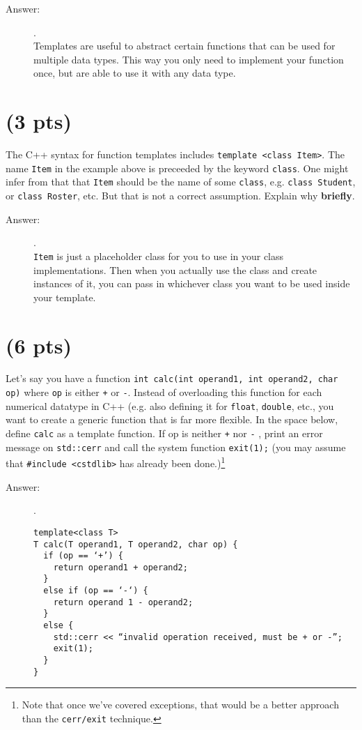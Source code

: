 \documentclass[11pt]{article}
\begin{document}
\begin{description}
  \item[Answer:] .\\
  Templates are useful to abstract certain functions that can be used for multiple data types.
  This way you only need to implement your function once, but are able to use it with any data type.
\end{description}


\section{(3 pts)}
\label{sec:org3ade83d}
The C++ syntax for function templates includes \texttt{template <class
  Item>}.  The name \texttt{Item} in the example above is preceeded by the
keyword \texttt{class}.  One might infer from that that \texttt{Item} should be
the name of some \texttt{class}, e.g. \texttt{class Student}, or \texttt{class Roster},
etc.  But that is not a correct assumption.  Explain
why \textbf{briefly}.

\begin{description}
  \item[Answer:] .\\
  \texttt{Item} is just a placeholder class for you to use in your class implementations.
  Then when you actually use the class and create instances of it, you can pass in whichever class you want to be used inside your template.
\end{description}


\section{(6 pts)}
\label{sec:org1cba9c0}

Let's say you have a function \texttt{int calc(int operand1, int operand2,
char op)} where \texttt{op} is either \texttt{+} or \texttt{-}.  Instead of overloading
this function for each numerical datatype in C++ (e.g. also defining
it for \texttt{float}, \texttt{double}, etc., you want to create a generic function
that is far more flexible.  In the space below, define \texttt{calc} as a
template function.  If op is neither \texttt{+} nor \texttt{-} , print an error
message on \texttt{std::cerr} and call the system function \texttt{exit(1);} (you
may assume that \texttt{\#include <cstdlib>} has already been done.)\footnote{Note
that once we've covered exceptions, that would be a better approach
than the \texttt{cerr/exit} technique.}

\begin{description}
  \item[Answer:] .\\
  \begin{verbatim}
template<class T>
T calc(T operand1, T operand2, char op) {
  if (op == ‘+’) {
    return operand1 + operand2;
  }
  else if (op == ‘-‘) {
    return operand 1 - operand2;
  }
  else {
    std::cerr << “invalid operation received, must be + or -”;
    exit(1);
  }
}
    \end{verbatim}
\end{description}
\end{document}
